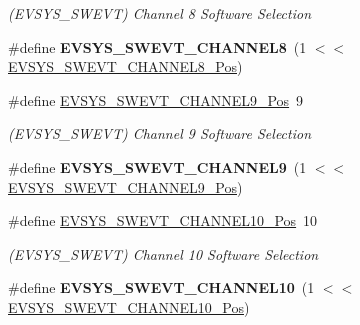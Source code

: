 \begin{DoxyCompactItemize}
\begin{DoxyCompactList}\small\item\em (E\+V\+S\+Y\+S\+\_\+\+S\+W\+E\+V\+T) Channel 8 Software Selection \end{DoxyCompactList}\item 
\hypertarget{group___s_a_m_l21___e_v_s_y_s_ga7c6762e156f5956149c6967eafddcbbd}{}\#define {\bfseries E\+V\+S\+Y\+S\+\_\+\+S\+W\+E\+V\+T\+\_\+\+C\+H\+A\+N\+N\+E\+L8}~(1 $<$$<$ \hyperlink{group___s_a_m_l21___e_v_s_y_s_ga42bdadb5359ee8f5d6d534ad7f0bc431}{E\+V\+S\+Y\+S\+\_\+\+S\+W\+E\+V\+T\+\_\+\+C\+H\+A\+N\+N\+E\+L8\+\_\+\+Pos})\label{group___s_a_m_l21___e_v_s_y_s_ga7c6762e156f5956149c6967eafddcbbd}

\item 
\hypertarget{group___s_a_m_l21___e_v_s_y_s_ga83e99e73d2237f443c327cfece7d6de3}{}\#define \hyperlink{group___s_a_m_l21___e_v_s_y_s_ga83e99e73d2237f443c327cfece7d6de3}{E\+V\+S\+Y\+S\+\_\+\+S\+W\+E\+V\+T\+\_\+\+C\+H\+A\+N\+N\+E\+L9\+\_\+\+Pos}~9\label{group___s_a_m_l21___e_v_s_y_s_ga83e99e73d2237f443c327cfece7d6de3}

\begin{DoxyCompactList}\small\item\em (E\+V\+S\+Y\+S\+\_\+\+S\+W\+E\+V\+T) Channel 9 Software Selection \end{DoxyCompactList}\item 
\hypertarget{group___s_a_m_l21___e_v_s_y_s_gad5ccf12fa8f233a81f1e9cfc1cedd24c}{}\#define {\bfseries E\+V\+S\+Y\+S\+\_\+\+S\+W\+E\+V\+T\+\_\+\+C\+H\+A\+N\+N\+E\+L9}~(1 $<$$<$ \hyperlink{group___s_a_m_l21___e_v_s_y_s_ga83e99e73d2237f443c327cfece7d6de3}{E\+V\+S\+Y\+S\+\_\+\+S\+W\+E\+V\+T\+\_\+\+C\+H\+A\+N\+N\+E\+L9\+\_\+\+Pos})\label{group___s_a_m_l21___e_v_s_y_s_gad5ccf12fa8f233a81f1e9cfc1cedd24c}

\item 
\hypertarget{group___s_a_m_l21___e_v_s_y_s_ga1eaa9ec8266a8d6c0ad351c8459dc993}{}\#define \hyperlink{group___s_a_m_l21___e_v_s_y_s_ga1eaa9ec8266a8d6c0ad351c8459dc993}{E\+V\+S\+Y\+S\+\_\+\+S\+W\+E\+V\+T\+\_\+\+C\+H\+A\+N\+N\+E\+L10\+\_\+\+Pos}~10\label{group___s_a_m_l21___e_v_s_y_s_ga1eaa9ec8266a8d6c0ad351c8459dc993}

\begin{DoxyCompactList}\small\item\em (E\+V\+S\+Y\+S\+\_\+\+S\+W\+E\+V\+T) Channel 10 Software Selection \end{DoxyCompactList}\item 
\hypertarget{group___s_a_m_l21___e_v_s_y_s_gae3ba368b9468d8ce7785b1c2d3c505f9}{}\#define {\bfseries E\+V\+S\+Y\+S\+\_\+\+S\+W\+E\+V\+T\+\_\+\+C\+H\+A\+N\+N\+E\+L10}~(1 $<$$<$ \hyperlink{group___s_a_m_l21___e_v_s_y_s_ga1eaa9ec8266a8d6c0ad351c8459dc993}{E\+V\+S\+Y\+S\+\_\+\+S\+W\+E\+V\+T\+\_\+\+C\+H\+A\+N\+N\+E\+L10\+\_\+\+Pos})\label{group___s_a_m_l21___e_v_s_y_s_gae3ba368b9468d8ce7785b1c2d3c505f9}


\end{DoxyCompactItemize}
